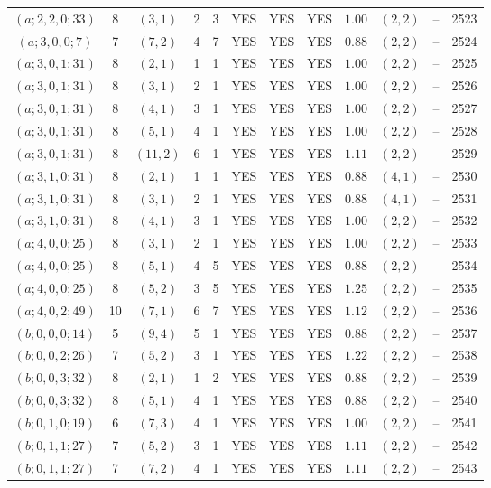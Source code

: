 \begin{longtable}{|c|c|c|c|c|c|c|c|c|c|c|c|}
$(a;2,2,0;33)$ & 8 & $(3,1)$ & 2 & 3 & YES & YES & YES & $1.00$ & $(2,2)$ & -- & 2523\\
$(a;3,0,0;7)$ & 7 & $(7,2)$ & 4 & 7 & YES & YES & YES & $0.88$ & $(2,2)$ & -- & 2524\\
$(a;3,0,1;31)$ & 8 & $(2,1)$ & 1 & 1 & YES & YES & YES & $1.00$ & $(2,2)$ & -- & 2525\\
$(a;3,0,1;31)$ & 8 & $(3,1)$ & 2 & 1 & YES & YES & YES & $1.00$ & $(2,2)$ & -- & 2526\\
$(a;3,0,1;31)$ & 8 & $(4,1)$ & 3 & 1 & YES & YES & YES & $1.00$ & $(2,2)$ & -- & 2527\\
$(a;3,0,1;31)$ & 8 & $(5,1)$ & 4 & 1 & YES & YES & YES & $1.00$ & $(2,2)$ & -- & 2528\\
$(a;3,0,1;31)$ & 8 & $(11,2)$ & 6 & 1 & YES & YES & YES & $1.11$ & $(2,2)$ & -- & 2529\\
$(a;3,1,0;31)$ & 8 & $(2,1)$ & 1 & 1 & YES & YES & YES & $0.88$ & $(4,1)$ & -- & 2530\\
$(a;3,1,0;31)$ & 8 & $(3,1)$ & 2 & 1 & YES & YES & YES & $0.88$ & $(4,1)$ & -- & 2531\\
$(a;3,1,0;31)$ & 8 & $(4,1)$ & 3 & 1 & YES & YES & YES & $1.00$ & $(2,2)$ & -- & 2532\\
$(a;4,0,0;25)$ & 8 & $(3,1)$ & 2 & 1 & YES & YES & YES & $1.00$ & $(2,2)$ & -- & 2533\\
$(a;4,0,0;25)$ & 8 & $(5,1)$ & 4 & 5 & YES & YES & YES & $0.88$ & $(2,2)$ & -- & 2534\\
$(a;4,0,0;25)$ & 8 & $(5,2)$ & 3 & 5 & YES & YES & YES & $1.25$ & $(2,2)$ & -- & 2535\\
$(a;4,0,2;49)$ & 10 & $(7,1)$ & 6 & 7 & YES & YES & YES & $1.12$ & $(2,2)$ & -- & 2536\\
$(b;0,0,0;14)$ & 5 & $(9,4)$ & 5 & 1 & YES & YES & YES & $0.88$ & $(2,2)$ & -- & 2537\\
$(b;0,0,2;26)$ & 7 & $(5,2)$ & 3 & 1 & YES & YES & YES & $1.22$ & $(2,2)$ & -- & 2538\\
$(b;0,0,3;32)$ & 8 & $(2,1)$ & 1 & 2 & YES & YES & YES & $0.88$ & $(2,2)$ & -- & 2539\\
$(b;0,0,3;32)$ & 8 & $(5,1)$ & 4 & 1 & YES & YES & YES & $0.88$ & $(2,2)$ & -- & 2540\\
$(b;0,1,0;19)$ & 6 & $(7,3)$ & 4 & 1 & YES & YES & YES & $1.00$ & $(2,2)$ & -- & 2541\\
$(b;0,1,1;27)$ & 7 & $(5,2)$ & 3 & 1 & YES & YES & YES & $1.11$ & $(2,2)$ & -- & 2542\\
$(b;0,1,1;27)$ & 7 & $(7,2)$ & 4 & 1 & YES & YES & YES & $1.11$ & $(2,2)$ & -- & 2543\\

\end{longtable}
